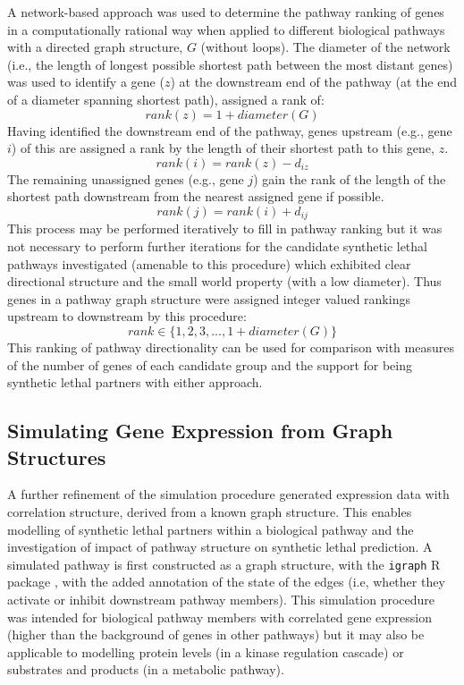 A network-based approach was used to determine the pathway ranking of genes in a computationally rational way when applied to different biological pathways with a directed graph structure, $G$ (without loops). The diameter of the network (i.e., the length of longest possible shortest path between the most distant genes) was used to identify a gene ($z$) at the downstream end of the pathway (at the end of a diameter spanning shortest path), assigned a rank of: $$rank(z) = 1 + diameter(G)$$ Having identified the downstream end of the pathway, genes upstream (e.g., gene $i$) of this are assigned a rank by the length of their shortest path to this gene, $z$. $$rank(i) = rank(z) - d_{iz}$$ The remaining unassigned genes (e.g., gene $j$) gain the rank of the length of the shortest path downstream from the nearest assigned gene if possible. $$rank(j) = rank(i) + d_{ij}$$ This process may be performed iteratively to fill in pathway ranking but it was not necessary to perform further iterations for the candidate synthetic lethal pathways investigated (amenable to this procedure) which exhibited clear directional structure and the small world property (with a low diameter). Thus genes in a pathway graph structure were assigned integer valued rankings upstream to downstream by this procedure: $$rank \in \{1, 2, 3, ..., 1 + diameter(G)\}$$
This ranking of pathway directionality can be used for comparison with measures of the number of genes of each candidate group and the support for being synthetic lethal partners with either approach.

\subsection{Simulating Gene Expression from Graph Structures} \label{methods:graphsim}
A further refinement of the simulation procedure generated expression data with correlation structure, derived from a known graph structure. %
This enables modelling of synthetic lethal partners within a biological pathway and the investigation of impact of pathway structure on synthetic lethal prediction. A simulated pathway is first constructed as a graph structure, with the \texttt{igraph} R package \citet{igraph}, with the added annotation of the state of the edges (i.e, whether they activate or inhibit downstream pathway members). This simulation procedure was intended for biological pathway members with correlated gene expression (higher than the background of genes in other pathways) but it may also be applicable to modelling protein levels (in a kinase regulation cascade) or substrates and products (in a metabolic pathway).%

